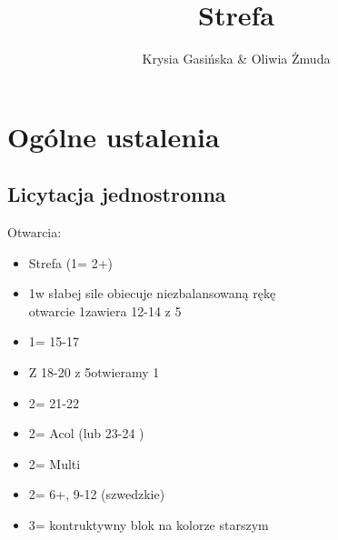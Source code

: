 \documentclass[12pt, a4paper]{report}
\title{\spades\clubs Strefa \xdiams\xhearts}
\author{Krysia Gasińska \& Oliwia Żmuda}
\begin{document}
\maketitle

\renewcommand{\contentsname}{Spis treści}
\tableofcontents

\chapter*{\colorbox{Plum!30}{Ogólne ustalenia}}
 {

    \vspace{-0.4cm}

    \section*{\colorbox{blue!30}{Licytacja jednostronna}}
    Otwarcia:
    \begin{itemize}
        \item Strefa (1\clubs = 2+)
        \item 1\diams w słabej sile obiecuje niezbalansowaną rękę\\
        otwarcie 1\clubs zawiera 12-14 \bal z 5\diams
        \item 1\nt = 15-17 \bal
        \item Z 18-20 \bal z 5\diams otwieramy 1\diams
        \item 2\nt = 21-22 \bal
        \item 2\clubs = Acol (\gf lub 23-24 \bal)
        \item 2\diams = Multi
        \item 2\major = 6+\major, 9-12 (szwedzkie)
        \item 3\nt = kontruktywny blok na kolorze starszym
    \end{itemize}

}
\end{document}
